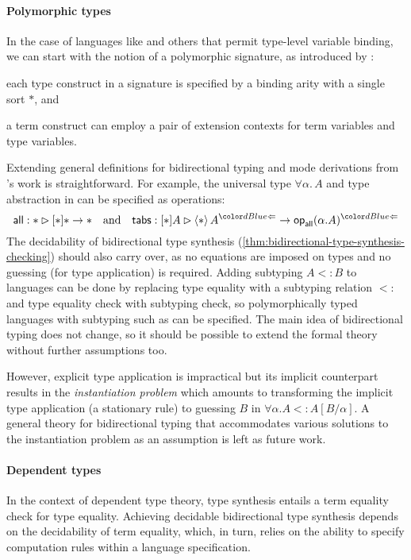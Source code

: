 \paragraph{Polymorphic types}
In the case of languages like \SystemF and others that permit type-level variable binding, we can start with the notion of a polymorphic signature, as introduced by \citet{Hamana2011}:
\begin{inlineenum}
  \item each type construct in a signature is specified by a binding arity with a single sort $*$, and
  \item a term construct can employ a pair of extension contexts for term variables and type variables.
\end{inlineenum}

Extending general definitions for bidirectional typing and mode derivations from \citeauthor{Hamana2011}'s work is straightforward. 
For example, the universal type $\forall \alpha.\, A$ and type abstraction in \SystemF can be specified as operations:
\[
\mathsf{all} : * \rhd [*] * \to *
\quad\text{and}\quad
\mathsf{tabs} : [*] A \rhd \left< * \right> A^{\chk} \to \tyOp_{\mathsf{all}}(\alpha. A)^{\chk}
\]
The decidability of bidirectional type synthesis (\cref{thm:bidirectional-type-synthesis-checking}) should also carry over, as no equations are imposed on types and no guessing (for type application) is required.
Adding subtyping $A \mathrel{<:} B$ to languages can be done by replacing type equality with a subtyping relation $\mathrel{<:}$ and type equality check with subtyping check, so polymorphically typed languages with subtyping such as \SystemFsub can be specified.
The main idea of bidirectional typing does not change, so it should be possible to extend the formal theory without further assumptions too.

However, explicit type application is impractical but its implicit counterpart results in the \emph{instantiation problem} which amounts to transforming the implicit type application (a stationary rule) to guessing $B$ in $\forall \alpha. A <: A[B/\alpha]$.
A general theory for bidirectional typing that accommodates various solutions to the instantiation problem as an assumption is left as future work.

\paragraph{Dependent types}
In the context of dependent type theory, type synthesis entails a term equality check for type equality.
Achieving decidable bidirectional type synthesis depends on the decidability of term equality, which, in turn, relies on the ability to specify computation rules within a language specification.

